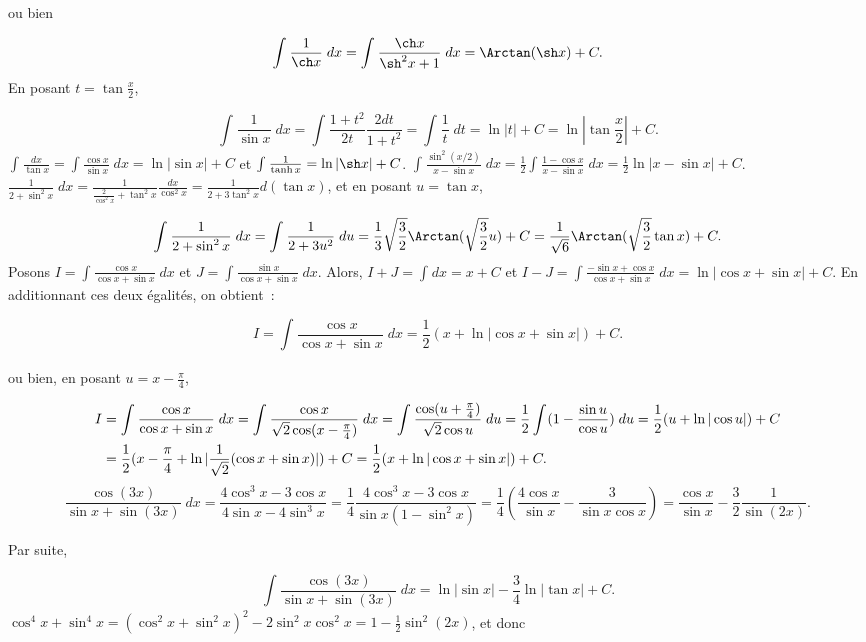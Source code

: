 {{ou bien

$$\int_{}^{}\frac{1}{\ch x}\;dx
=\int_{}^{}\frac{\ch x}{\sh^2x+1}\;dx=\Arctan(\sh x)+C.$$
En posant $t=\tan\frac{x}{2}$,

$$\int_{}^{}\frac{1}{\sin x}\;dx=\int_{}^{}\frac{1+t^2}{2t}\frac{2dt}{1+t^2}=\int_{}^{}\frac{1}{t}\;dt=\ln|t|+C=\ln|\tan\frac{x}{2}|+C.$$
$\int_{}^{}\frac{dx}{\tan x}=\int_{}^{}\frac{\cos x}{\sin x}\;dx=\ln|\sin x|+C$ et $\int_{}^{}\frac{1}{\tanh x}=\ln|\sh x|+C$.
$\int_{}^{}\frac{\sin^2(x/2)}{x-\sin x}\;dx=\frac{1}{2}\int_{}^{}\frac{1-\cos x}{x-\sin x}\;dx=\frac{1}{2}\ln|x-\sin x|+C$.
$\frac{1}{2+\sin^2x}\;dx=\frac{1}{\frac{2}{\cos^2x}+\tan^2x}\frac{dx}{\cos^2x}=\frac{1}{2+3\tan^2x}d(\tan x)$, et en posant $u=\tan x$,

$$\int_{}^{}\frac{1}{2+\sin^2x}\;dx=\int_{}^{}\frac{1}{2+3u^2}\;du=\frac{1}{3}\sqrt{\frac{3}{2}}\Arctan(\sqrt{\frac{3}{2}}u)+C=\frac{1}{\sqrt{6}}\Arctan(\sqrt{\frac{3}{2}}\tan x)+C.$$
Posons $I=\int_{}^{}\frac{\cos x}{\cos x+\sin x}\;dx$ et $J=\int_{}^{}\frac{\sin x}{\cos x+\sin x}\;dx$. Alors, $I+J=\int_{}^{}dx=x+C$ et $I-J=\int_{}^{}\frac{-\sin x+\cos x}{\cos x+\sin x}\;dx=\ln|\cos x+\sin x|+C$. En additionnant ces deux égalités, on obtient~:

$$I=\int_{}^{}\frac{\cos x}{\cos x+\sin x}\;dx=\frac{1}{2}(x+\ln|\cos x+\sin x|)+C.$$

ou bien, en posant $u=x-\frac{\pi}{4}$,

\begin{align*}\ensuremath
I&=\int_{}^{}\frac{\cos x}{\cos x+\sin x}\;dx=\int_{}^{}\frac{\cos x}{\sqrt{2}\cos(x-\frac{\pi}{4})}\;dx
=\int_{}^{}\frac{\cos(u+\frac{\pi}{4})}{\sqrt{2}\cos u}\;du=\frac{1}{2}\int_{}^{}(1-\frac{\sin u}{\cos u})\;du
=\frac{1}{2}(u+\ln|\cos u|)+C\\
 &=\frac{1}{2}(x-\frac{\pi}{4}+\ln|\frac{1}{\sqrt{2}}(\cos x+\sin x)|)+C=\frac{1}{2}(x+\ln|\cos x+\sin x|)+C.
\end{align*}
$$\frac{\cos(3x)}{\sin x+\sin(3x)}\;dx=\frac{4\cos^3x-3\cos x}{4\sin x-4\sin^3x}=\frac{1}{4}\frac{4\cos^3x-3\cos x}{\sin x(1-\sin^2x)}=\frac{1}{4}(\frac{4\cos x}{\sin x}-\frac{3}{\sin x\cos x})=\frac{\cos x}{\sin x}-\frac{3}{2}\frac{1}{\sin(2x)}.
$$

Par suite,

$$\int_{}^{}\frac{\cos(3x)}{\sin x+\sin(3x)}\;dx=\ln|\sin x|-\frac{3}{4}\ln|\tan x|+C.$$
$\cos^4x+\sin^4x=(\cos^2x+\sin^2x)^2-2\sin^2x\cos^2x=1-\frac{1}{2}\sin^2(2x)$, et donc

}}
